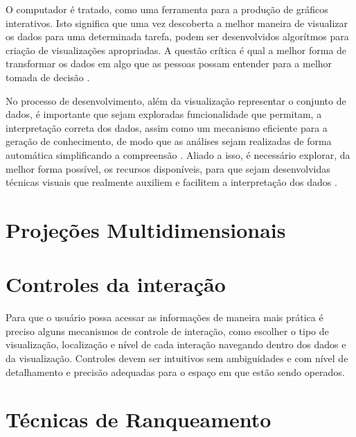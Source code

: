 O computador é tratado,  como uma ferramenta para a produção de gráficos interativos. Isto significa que uma vez descoberta a melhor maneira de visualizar os dados para uma determinada tarefa, podem ser desenvolvidos algorítmos para criação de visualizações apropriadas. A questão crítica é qual a melhor forma de transformar os dados em algo que as pessoas possam entender para a melhor tomada de decisão \cite{ware2012information}.

No processo de desenvolvimento, além da visualização representar o conjunto de dados, é importante que sejam exploradas funcionalidade que permitam, a interpretação correta dos dados, assim como um mecanismo eficiente para a geração de conhecimento, de modo que as análises sejam realizadas de forma automática simplificando a compreensão \cite{keim2006challenges}. Aliado a isso, é necessário explorar, da melhor forma possível, os recursos disponíveis, para que sejam desenvolvidas técnicas visuais que realmente auxiliem e facilitem a interpretação dos dados \cite{keim2006challenges}.



\section{Projeções Multidimensionais}
\label{Projecoes-multidimensionais-sec}



\section{Controles da interação}

Para que o usuário possa acessar as informações de maneira mais prática é preciso alguns mecanismos de controle de interação, como escolher o tipo de visualização, localização e nível de cada interação navegando dentro dos dados e da visualização. Controles devem ser intuitivos sem ambiguidades e com nível de detalhamento e precisão adequadas para o espaço em que estão sendo operados\cite{ward2015interactive}. 

%
%

\section{Técnicas de Ranqueamento}

